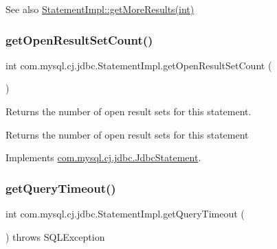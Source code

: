 \begin{DoxySeeAlso}{See also}
\mbox{\hyperlink{classcom_1_1mysql_1_1cj_1_1jdbc_1_1_statement_impl_a2cf53265012d4410f8090334c4837e81}{Statement\+Impl\+::get\+More\+Results(int)}} 
\end{DoxySeeAlso}
\mbox{\label{classcom_1_1mysql_1_1cj_1_1jdbc_1_1_statement_impl_ac4a8718b3d1e416f72dbe33370434b0d}} 
\subsubsection{\texorpdfstring{get\+Open\+Result\+Set\+Count()}{getOpenResultSetCount()}}
{\footnotesize\ttfamily int com.\+mysql.\+cj.\+jdbc.\+Statement\+Impl.\+get\+Open\+Result\+Set\+Count (\begin{DoxyParamCaption}{ }\end{DoxyParamCaption})}

Returns the number of open result sets for this statement.

\begin{DoxyReturn}{Returns}
the number of open result sets for this statement 
\end{DoxyReturn}


Implements \mbox{\hyperlink{interfacecom_1_1mysql_1_1cj_1_1jdbc_1_1_jdbc_statement_ad7367340b87accdd66c01872ebaddbcd}{com.\+mysql.\+cj.\+jdbc.\+Jdbc\+Statement}}.

\mbox{\label{classcom_1_1mysql_1_1cj_1_1jdbc_1_1_statement_impl_acc6d1eb26165bde353224ca1c5d9f4cb}} 
\subsubsection{\texorpdfstring{get\+Query\+Timeout()}{getQueryTimeout()}}
{\footnotesize\ttfamily int com.\+mysql.\+cj.\+jdbc.\+Statement\+Impl.\+get\+Query\+Timeout (\begin{DoxyParamCaption}{ }\end{DoxyParamCaption}) throws S\+Q\+L\+Exception}

